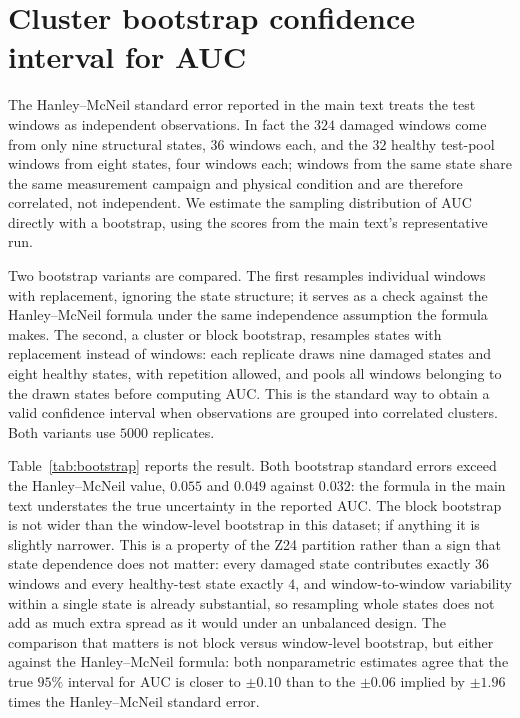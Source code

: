 \documentclass[11pt,a4paper]{article}
\begin{document}
\section{Cluster bootstrap confidence interval for AUC}
\label{sec:bootstrap}

The Hanley--McNeil standard error reported in the main text treats the test
windows as independent observations. In fact the $324$ damaged windows come
from only nine structural states, $36$ windows each, and the $32$ healthy
test-pool windows from eight states, four windows each; windows from the
same state share the same measurement campaign and physical condition and
are therefore correlated, not independent. We estimate the sampling
distribution of AUC directly with a bootstrap, using the scores from the
main text's representative run.

Two bootstrap variants are compared. The first resamples individual windows
with replacement, ignoring the state structure; it serves as a check against
the Hanley--McNeil formula under the same independence assumption the
formula makes. The second, a cluster or block bootstrap, resamples states
with replacement instead of windows: each replicate draws nine damaged
states and eight healthy states, with repetition allowed, and pools all
windows belonging to the drawn states before computing AUC. This is the
standard way to obtain a valid confidence interval when observations are
grouped into correlated clusters. Both variants use $5000$ replicates.

Table~\ref{tab:bootstrap} reports the result. Both bootstrap standard errors
exceed the Hanley--McNeil value, $0.055$ and $0.049$ against $0.032$: the
formula in the main text understates the true uncertainty in the reported
AUC. The block bootstrap is not wider than the window-level bootstrap in
this dataset; if anything it is slightly narrower. This is a property of
the Z24 partition rather than a sign that state dependence does not matter:
every damaged state contributes exactly $36$ windows and every healthy-test
state exactly $4$, and window-to-window variability within a single state is
already substantial, so resampling whole states does not add as much extra
spread as it would under an unbalanced design. The comparison that matters
is not block versus window-level bootstrap, but either against the
Hanley--McNeil formula: both nonparametric estimates agree that the true
$95\%$ interval for AUC is closer to $\pm0.10$ than to the $\pm0.06$
implied by $\pm 1.96$ times the Hanley--McNeil standard error.
\end{document}
